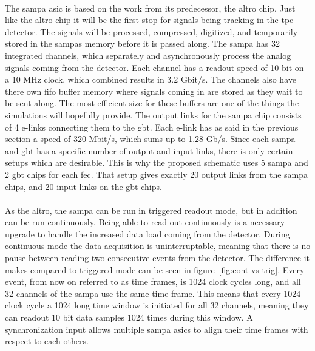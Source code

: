 \documentclass[a4paper]{report}
\begin{document}
{\paragraph{}
The \gls{sampa} \gls{asic} is based on the work from its predecessor, the \gls{altro} chip.
Just like the \gls{altro} chip it will be the first stop for signals being tracking in the \gls{tpc} detector.
The signals will be processed, compressed, digitized, and temporarily stored in the \glspl{sampa} memory before it is passed along.
The \gls{sampa} has 32 integrated channels, which separately and asynchronously process the analog signals coming from the detector.\cite{tdr-016}
Each channel has a readout speed of 10 bit on a 10 MHz clock, which combined results in 3.2 Gbit/s.
The channels also have there own \gls{fifo} buffer memory where signals coming in are stored as they wait to be sent along.
The most efficient size for these buffers are one of the things the simulations will hopefully provide.
The output links for the \gls{sampa} chip consists of 4 e-links connecting them to the \gls{gbt}.
Each e-link has as said in the previous section a speed of 320 Mbit/s, which sums up to 1.28 Gb/s.\cite{tdr-015}
Since each \gls{sampa} and \gls{gbt} has a specific number of output and input links, there is only certain setups which are desirable.
This is why the proposed schematic uses 5 \gls{sampa} and 2 \gls{gbt} chips for each \gls{fec}.
That setup gives exactly 20 output links from the \gls{sampa} chips, and 20 input links on the \gls{gbt} chips.

\paragraph{}
As the \gls{altro}, the \gls{sampa} can be run in triggered readout mode, but in addition can be run continuously.
Being able to read out continuously is a necessary upgrade to handle the increased data load coming from the detector.
During continuous mode the data acquisition is uninterruptable, meaning that there is no pause between reading two consecutive events from the detector.
The difference it makes compared to triggered mode can be seen in figure~\ref{fig:cont-vs-trig}.
Every event, from now on referred to as time frames, is 1024 clock cycles long, and all 32 channels of the \gls{sampa} use the same time frame.
This means that every 1024 clock cycle a 1024 long time window is initiated for all 32 channels, meaning they can readout 10 bit data samples 1024 times during this window.
A synchronization input allows multiple \gls{sampa} \gls{asic}s to align their time frames with respect to each others.\cite{tdr-015}

}
\end{document}
